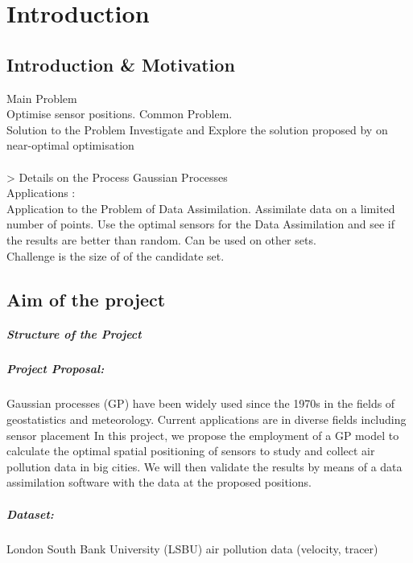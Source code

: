 \chapter{Introduction}

\section{Introduction \& Motivation }

Main Problem \\
Optimise sensor positions. Common Problem. \\



Solution to the Problem
Investigate and Explore the solution proposed by \citet{krause_near-optimal_2008} on near-optimal optimisation \\
\\ > Details on the Process
Gaussian Processes \\


Applications : \\
Application to the Problem of Data Assimilation. Assimilate data on a limited number of points. Use the optimal sensors for the Data Assimilation and see if the results are better than random.  Can be used on other sets.  \\

Challenge is the size of of the candidate set. \\


 







\section{Aim of the project }


\paragraph{Structure of the Project}



\paragraph{Project Proposal:}
Gaussian processes (GP) have been widely used since the 1970s in the fields of geostatistics and meteorology. Current applications are in diverse fields including sensor placement
In this project, we propose the employment of a GP model to calculate the optimal spatial positioning of sensors to study and collect air pollution data in big cities. We will then validate the results by means of a data assimilation software with the data at the proposed positions.

\paragraph{Dataset:} London South Bank University (LSBU) air pollution data (velocity, tracer)


